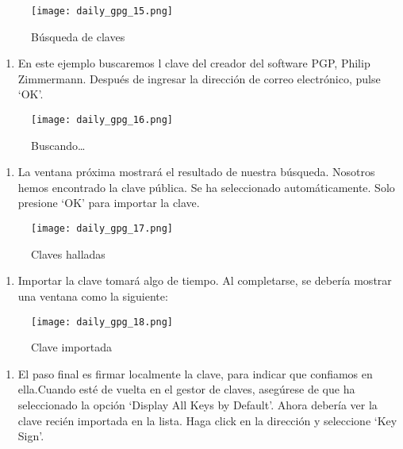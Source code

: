 \documentclass[10pt,a5paper,twoside,,]{book}
\providecommand{\tightlist}{%
  \setlength{\itemsep}{0pt}\setlength{\parskip}{0pt}}
\begin{document}
\begin{figure}[htbp]
\centering
\texttt{[image: daily\_gpg\_15.png]}
\caption{Búsqueda de claves}
\end{figure}

\begin{enumerate}
\def\labelenumi{\arabic{enumi}.}
\setcounter{enumi}{2}
\tightlist
\item
  En este ejemplo buscaremos l clave del creador del software PGP,
  Philip Zimmermann. Después de ingresar la dirección de correo
  electrónico, pulse `OK'.
\end{enumerate}

\begin{figure}[htbp]
\centering
\texttt{[image: daily\_gpg\_16.png]}
\caption{Buscando\ldots{}}
\end{figure}

\begin{enumerate}
\def\labelenumi{\arabic{enumi}.}
\setcounter{enumi}{3}
\tightlist
\item
  La ventana próxima mostrará el resultado de nuestra búsqueda. Nosotros
  hemos encontrado la clave pública. Se ha seleccionado automáticamente.
  Solo presione `OK' para importar la clave.
\end{enumerate}

\begin{figure}[htbp]
\centering
\texttt{[image: daily\_gpg\_17.png]}
\caption{Claves halladas}
\end{figure}

\begin{enumerate}
\def\labelenumi{\arabic{enumi}.}
\setcounter{enumi}{4}
\tightlist
\item
  Importar la clave tomará algo de tiempo. Al completarse, se debería
  mostrar una ventana como la siguiente:
\end{enumerate}

\begin{figure}[htbp]
\centering
\texttt{[image: daily\_gpg\_18.png]}
\caption{Clave importada}
\end{figure}

\begin{enumerate}
\def\labelenumi{\arabic{enumi}.}
\setcounter{enumi}{5}
\tightlist
\item
  El paso final es firmar localmente la clave, para indicar que
  confiamos en ella.Cuando esté de vuelta en el gestor de claves,
  asegúrese de que ha seleccionado la opción `Display All Keys by
  Default'. Ahora debería ver la clave recién importada en la lista.
  Haga click en la dirección y seleccione `Key Sign'.
\end{enumerate}
\end{document}
